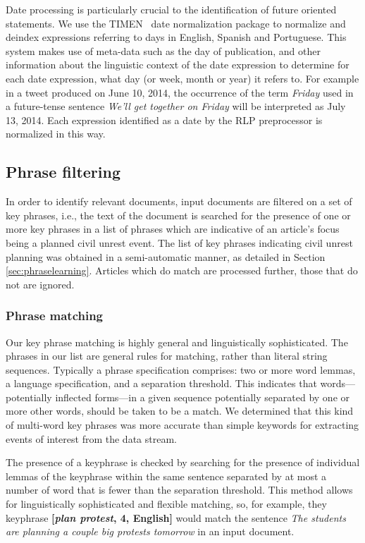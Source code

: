 Date processing is particularly crucial to the identification of
future oriented statements. We use the TIMEN~\cite{LlorensDGS12} date
normalization package to normalize and deindex expressions referring
to days in English, Spanish and Portuguese. This system makes use of
meta-data such as the day of publication, and other information about
the linguistic context of the date expression to determine for each
date expression, what day (or week, month or year) it refers to.  For
example in a tweet produced on June 10, 2014, the occurrence of the
term {\em Friday} used in a future-tense sentence {\em We'll get
  together on Friday} will be interpreted as July 13, 2014.  Each
expression identified as a date by the RLP preprocessor is normalized
in this way.

\subsection{Phrase filtering}
In order to identify relevant documents, input documents are filtered on a set of key phrases, i.e.,
the text of the document is searched for the presence of one or
more key phrases in a list of phrases which are indicative of an article's focus being
a planned civil unrest event.  
The list of key phrases indicating civil unrest planning was obtained
in a semi-automatic manner, as detailed in Section \ref{sec:phraselearning}.
Articles which do match are processed further, those that do not are ignored.

\subsubsection{Phrase matching}
Our key phrase matching is highly general and linguistically
sophisticated.  The phrases in our list are general rules for
matching, rather than literal string sequences. Typically a phrase
specification comprises: two or more word lemmas, a language
specification, and a separation threshold. This indicates that words---potentially inflected forms---in 
a given sequence potentially separated by one or more other words, should be taken to be a
match. We determined that this kind of
multi-word key phrases was more accurate than simple keywords for
extracting events of interest from the data stream.

The presence of a keyphrase is checked by searching for the presence of
individual lemmas of the keyphrase within the same sentence separated
by at most a number of word that is fewer than the separation threshold.  
This method allows for linguistically sophisticated and flexible matching, so, for example,
they keyphrase {\bf [{\em plan protest}, 4, English]} would match the sentence
{\em The students are planning a couple big protests tomorrow} in an input document.

